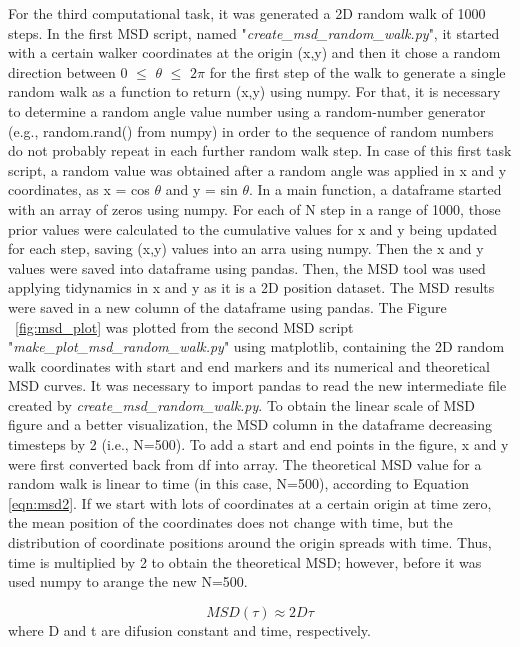 \documentclass{article}
\begin{document}
For the third computational task, it was generated a 2D random walk of 1000 steps. In the first MSD script, named "{\it create_msd_random_walk.py}", it started with a certain walker coordinates at the origin (x,y) and then it chose a random direction between 0 $\leq$ $\theta$ $\leq$ $2\pi$ for the first step of the walk to generate a single random walk as a function to return (x,y) using numpy. For that, it is necessary to determine a random angle value number using a random-number generator (e.g., random.rand() from numpy) in order to the sequence of random numbers do not probably repeat in each further random walk step. In case of this first task script, a random value was obtained after a random angle was applied in x and y coordinates, as x = cos $\theta$ and y = sin $\theta$. In a main function, a dataframe started with an array of zeros using numpy. For each of N step in a range of 1000, those prior values were calculated to the cumulative values for x and y being updated for each step, saving (x,y) values into an arra using numpy. Then the x and y values were saved into dataframe using pandas. Then, the MSD tool was used applying tidynamics in x and y as it is a 2D position dataset. The MSD results were saved in a new column of the dataframe using pandas. The Figure ~\ref{fig:msd_plot} was plotted from the second MSD script "{\it make_plot_msd_random_walk.py}" using matplotlib, containing the 2D random walk coordinates with start and end markers and its numerical and theoretical MSD curves. It was necessary to import pandas to read the new intermediate file created by {\it create_msd_random_walk.py}. To obtain the linear scale of MSD figure and a better visualization, the MSD column in the dataframe decreasing timesteps by 2 (i.e., N=500). To add a start and end points in the figure, x and y were first converted back from df into array. The theoretical MSD value for a random walk is linear to time (in this case, N=500), according to Equation \ref{eqn:msd2}. If we start with lots of coordinates at a certain origin at time zero, the mean position of the coordinates does not change with time, but the distribution of coordinate positions around the origin spreads with time. Thus, time is multiplied by 2 to obtain the theoretical MSD; however, before it was used numpy to arange the new N=500.

\begin{equation}
MSD(\tau) \approx 2 D \tau
\label{eqn:msd2}
\end{equation}
where D and t are difusion constant and time, respectively.
\end{document}
